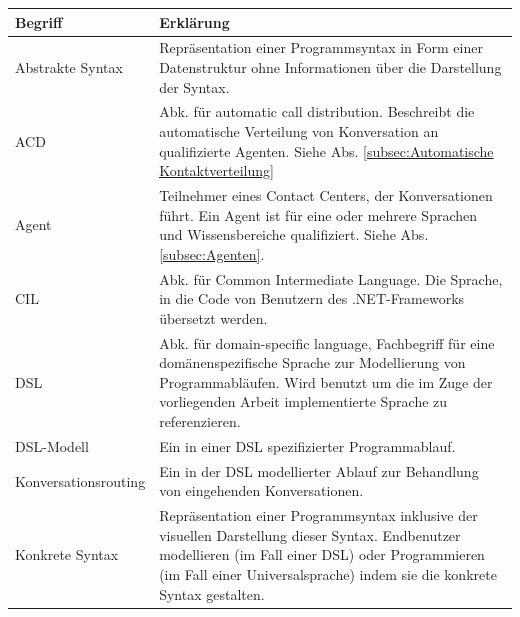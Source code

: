 \begin{table}[hbtp]
\centering
\settowidth{}
\begin{tabulary}{1.0\textwidth}{L|L}
\textbf{Begriff} & \textbf{Erklärung} \\
\hline
Abstrakte Syntax & Repräsentation einer Programmsyntax in Form einer Datenstruktur ohne Informationen über die Darstellung der Syntax.\\

\hline

ACD & Abk. für automatic call distribution. Beschreibt die automatische Verteilung von Konversation an qualifizierte Agenten. Siehe Abs. \ref{subsec:Automatische Kontaktverteilung} \\

\hline

Agent & Teilnehmer eines Contact Centers, der Konversationen führt. Ein Agent ist für eine oder mehrere Sprachen und Wissensbereiche qualifiziert. Siehe Abs. \ref{subsec:Agenten}. \\

\hline

CIL & Abk. für Common Intermediate Language. Die Sprache, in die Code von Benutzern des .NET-Frameworks übersetzt werden. \\

\hline

DSL & Abk. für domain-specific language, Fachbegriff für eine domänenspezifische Sprache zur Modellierung von Programmabläufen. Wird benutzt um die im Zuge der vorliegenden Arbeit implementierte Sprache zu referenzieren.\\

\hline

DSL-Modell & Ein in einer DSL spezifizierter Programmablauf.\\

\hline
    
Konversationsrouting & Ein in der DSL modellierter Ablauf zur Behandlung von eingehenden Konversationen.\\

\hline

Konkrete Syntax & Repräsentation einer Programmsyntax inklusive der visuellen Darstellung dieser Syntax. Endbenutzer modellieren (im Fall einer DSL) oder Programmieren (im Fall einer Universalsprache) indem sie die konkrete Syntax gestalten.\\

\hline


\end{tabulary}
\end{table}
